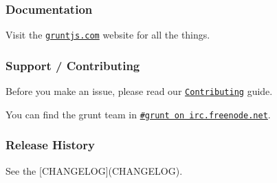 \href{http://travis-ci.org/gruntjs/grunt}{\tt } \href{https://ci.appveyor.com/project/gruntjs/grunt}{\tt } \href{http://gruntjs.com/}{\tt }



\subsubsection*{Documentation}

Visit the \href{http://gruntjs.com/}{\tt gruntjs.\+com} website for all the things.

\subsubsection*{Support / Contributing}

Before you make an issue, please read our \href{http://gruntjs.com/contributing}{\tt Contributing} guide.

You can find the grunt team in \href{http://webchat.freenode.net/?channels=grunt}{\tt \#grunt on irc.\+freenode.\+net}.

\subsubsection*{Release History}

See the \mbox{[}C\+H\+A\+N\+G\+E\+L\+OG\mbox{]}(C\+H\+A\+N\+G\+E\+L\+OG). 